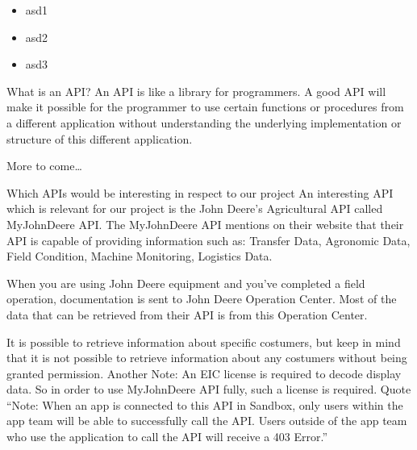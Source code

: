 \begin{itemize}[noitemsep]
    \item asd1
    \item asd2
    \item asd3
\end{itemize}
What is an API?
An API is like a library for programmers. A good API will make it possible for the programmer to use certain functions or procedures from a different application without understanding the underlying implementation or structure of this different application.

More to come…


Which APIs would be interesting in respect to our project
An interesting API which is relevant for our project is the John Deere’s Agricultural API called MyJohnDeere API.
The MyJohnDeere API mentions on their website that their API is capable of providing information such as:
Transfer Data, Agronomic Data, Field Condition, Machine Monitoring, Logistics Data.

When you are using John Deere equipment and you’ve completed a field operation, documentation is sent to John Deere Operation Center. Most of the data that can be retrieved from their API is from this Operation Center.

It is possible to retrieve information about specific costumers, but keep in mind that it is not possible to retrieve information about any costumers without being granted permission. 
Another Note: An EIC license is required to decode display data. So in order to use MyJohnDeere API fully, such a license is required.
Quote
“Note: When an app is connected to this API in Sandbox, only users within the app team will be able to successfully call the API. Users outside of the app team who use the application to call the API will receive a 403 Error.”

